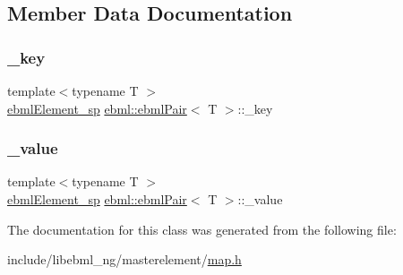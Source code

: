 \subsection{Member Data Documentation}
\mbox{\label{classebml_1_1ebmlPair_a249e518ff62935795def352767e358c9}} 
\subsubsection{\texorpdfstring{\+\_\+key}{\_key}}
{\footnotesize\ttfamily template$<$typename T $>$ \\
\mbox{\hyperlink{namespaceebml_adad533b7705a16bb360fe56380c5e7be}{ebml\+Element\+\_\+sp}} \mbox{\hyperlink{classebml_1_1ebmlPair}{ebml\+::ebml\+Pair}}$<$ T $>$\+::\+\_\+key\hspace{0.3cm}{\ttfamily [protected]}}

\mbox{\label{classebml_1_1ebmlPair_af34944c081ca98c445403101d5b9cb2f}} 
\subsubsection{\texorpdfstring{\+\_\+value}{\_value}}
{\footnotesize\ttfamily template$<$typename T $>$ \\
\mbox{\hyperlink{namespaceebml_adad533b7705a16bb360fe56380c5e7be}{ebml\+Element\+\_\+sp}} \mbox{\hyperlink{classebml_1_1ebmlPair}{ebml\+::ebml\+Pair}}$<$ T $>$\+::\+\_\+value\hspace{0.3cm}{\ttfamily [protected]}}



The documentation for this class was generated from the following file\+:\begin{DoxyCompactItemize}
\item 
include/libebml\+\_\+ng/masterelement/\mbox{\hyperlink{map_8h}{map.\+h}}\end{DoxyCompactItemize}
